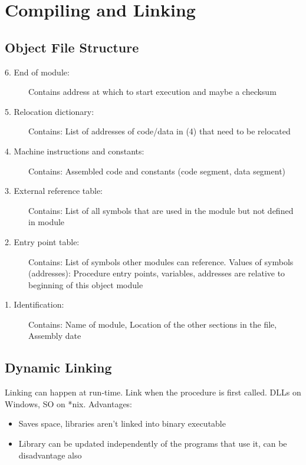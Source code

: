 \section{Compiling and Linking}
\subsection{Object File Structure}
\begin{description}
	\item[6. End of module:] Contains address at which to start execution and maybe a checksum
	\item[5. Relocation dictionary:] Contains: List of addresses of code/data in (4) that need to be relocated
	\item[4. Machine instructions and constants:] Contains: Assembled code and constants (code segment, data segment)
	\item[3. External reference table:] Contains: List of all symbols that are used in the module but not defined in module
	\item[2. Entry point table:] Contains: List of symbols other modules can reference. Values of symbols (addresses): Procedure entry points, variables, addresses are relative to beginning of this object module
	\item[1. Identification:] Contains: Name of module, Location of the other sections in the file, Assembly date
\end{description}

\subsection{Dynamic Linking}
Linking can happen at run-time. Link when the procedure is first called. DLLs on Windows, SO on *nix. Advantages:
\begin{itemize}
	\item Saves space, libraries aren't linked into binary executable
	\item Library can be updated independently of the programs that use it, can be disadvantage also
\end{itemize}
